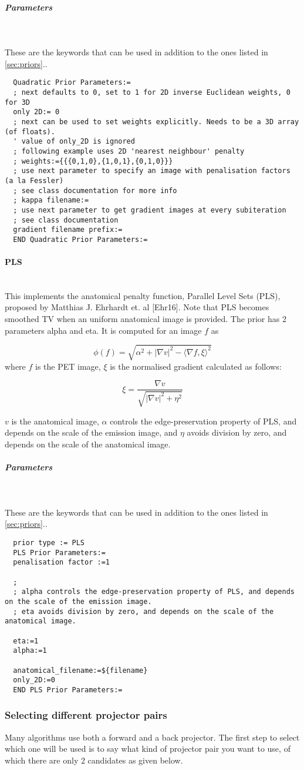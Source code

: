 \documentclass{article}
\newcommand{\subsubsubsection}[1]{\paragraph{#1}\mbox{} \\}
\newcommand{\subsubsubsubsection}[1]{\subparagraph{#1} \mbox{} \\}
\begin{document}
{{{{ \subsubsubsubsection{Parameters}
}
  These are the keywords that can be used in addition to the ones listed in \ref{sec:priors}..
  \begin{verbatim}
  Quadratic Prior Parameters:=
  ; next defaults to 0, set to 1 for 2D inverse Euclidean weights, 0 for 3D 
  only 2D:= 0
  ; next can be used to set weights explicitly. Needs to be a 3D array (of floats).
  ' value of only_2D is ignored
  ; following example uses 2D 'nearest neighbour' penalty
  ; weights:={{{0,1,0},{1,0,1},{0,1,0}}}
  ; use next parameter to specify an image with penalisation factors (a la Fessler)
  ; see class documentation for more info
  ; kappa filename:=
  ; use next parameter to get gradient images at every subiteration
  ; see class documentation
  gradient filename prefix:= 
  END Quadratic Prior Parameters:=
  \end{verbatim}
  
{ \subsubsubsection{PLS}
This implements the  anatomical penalty function, Parallel Level Sets (PLS),  proposed by Matthias J. Ehrhardt et. al [Ehr16]. Note that
  PLS becomes smoothed TV when an uniform anatomical image is provided.  
The prior has 2 parameters alpha and eta. It is computed for an image $ f $ as

  \[
  \phi(f) = \sqrt{\alpha^2 + |\nabla v|^2 - {\langle\nabla f,\xi\rangle}^2}
  \]
  where $ f $ is the PET image, $ \xi $ is the normalised gradient calculated as follows:

  \[
  \xi = \frac{\nabla v}{\sqrt{|\nabla v|^2 + \eta^2}}
  \]

  $ v $ is the anatomical image, $ \alpha $ controls the edge-preservation property of PLS, and depends on the scale of the emission image,
  and $ \eta $ avoids division by zero, and depends on the scale of the anatomical image. 
}
{ \subsubsubsubsection{Parameters}
}
  These are the keywords that can be used in addition to the ones listed in \ref{sec:priors}..
  \begin{verbatim}
  prior type := PLS
  PLS Prior Parameters:=
  penalisation factor :=1

  ; 
  ; alpha controls the edge-preservation property of PLS, and depends on the scale of the emission image. 
  ; eta avoids division by zero, and depends on the scale of the anatomical image. 

  eta:=1
  alpha:=1

  anatomical_filename:=${filename}
  only_2D:=0
  END PLS Prior Parameters:=
  \end{verbatim}
\subsubsection{
Selecting different projector pairs}
\label{sec:projectorpairs}
Many algorithms use both a forward and a back projector. The 
first step to select which one will be used is to say what kind 
of projector pair you want to use, of which there are only 2 
candidates as given below. 


}}}
\end{document}
